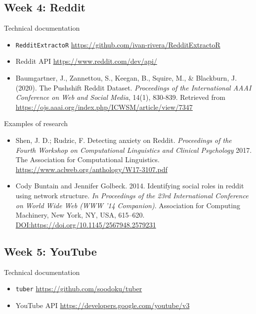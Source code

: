 \documentclass[11pt,]{article}
\providecommand{\tightlist}{%
  \setlength{\itemsep}{0pt}\setlength{\parskip}{0pt}}
\begin{document}
\hypertarget{week-4-reddit}{%
\subsection{Week 4: Reddit}\label{week-4-reddit}}

Technical documentation

\begin{itemize}
\tightlist
\item
  \texttt{RedditExtractoR}
  \url{https://github.com/ivan-rivera/RedditExtractoR}
\item
  Reddit API \url{https://www.reddit.com/dev/api/}
\item
  Baumgartner, J., Zannettou, S., Keegan, B., Squire, M., \& Blackburn,
  J. (2020). The Pushshift Reddit Dataset. \emph{Proceedings of the
  International AAAI Conference on Web and Social Media}, 14(1),
  830-839. Retrieved from
  \url{https://ojs.aaai.org/index.php/ICWSM/article/view/7347}
\end{itemize}

Examples of research

\begin{itemize}
\tightlist
\item
  Shen, J. D.; Rudzic, F. Detecting anxiety on Reddit. \emph{Proceedings
  of the Fourth Workshop on Computational Linguistics and Clinical
  Psychology} 2017. The Association for Computational Linguistics.
  \url{https://www.aclweb.org/anthology/W17-3107.pdf}
\item
  Cody Buntain and Jennifer Golbeck. 2014. Identifying social roles in
  reddit using network structure. \emph{In Proceedings of the 23rd
  International Conference on World Wide Web (WWW '14 Companion)}.
  Association for Computing Machinery, New York, NY, USA, 615--620.
  \url{DOI:https://doi.org/10.1145/2567948.2579231}
\end{itemize}

\hypertarget{week-5-youtube}{%
\subsection{Week 5: YouTube}\label{week-5-youtube}}

Technical documentation

\begin{itemize}
\tightlist
\item
  \texttt{tuber} \url{https://github.com/soodoku/tuber}
\item
  YouTube API \url{https://developers.google.com/youtube/v3}
\end{itemize}
\end{document}
